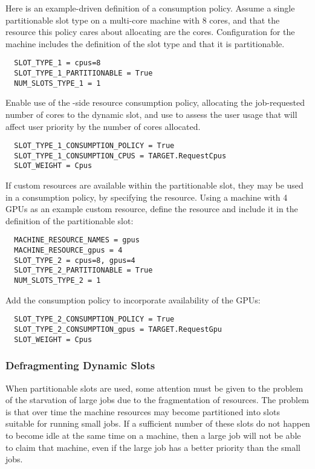 Here is an example-driven definition of a consumption policy.
Assume a single partitionable slot type on a multi-core machine with
8 cores,
and that the resource this policy cares about allocating are the cores.
Configuration for the machine includes the definition of the slot type 
and that it is partitionable.
\begin{verbatim}
  SLOT_TYPE_1 = cpus=8
  SLOT_TYPE_1_PARTITIONABLE = True
  NUM_SLOTS_TYPE_1 = 1
\end{verbatim}

Enable use of the -side resource consumption
policy, allocating the job-requested number of cores to the
dynamic slot, and use  to assess the user usage that 
will affect user priority by the number of cores allocated.
\begin{verbatim}
  SLOT_TYPE_1_CONSUMPTION_POLICY = True
  SLOT_TYPE_1_CONSUMPTION_CPUS = TARGET.RequestCpus
  SLOT_WEIGHT = Cpus
\end{verbatim}

If custom resources are available within the partitionable slot,
they may be used in a consumption policy, by specifying the 
resource.
Using a machine with 4 GPUs as an example custom resource,
define the resource and include it in the definition of the partitionable
slot:
\begin{verbatim}
  MACHINE_RESOURCE_NAMES = gpus
  MACHINE_RESOURCE_gpus = 4
  SLOT_TYPE_2 = cpus=8, gpus=4
  SLOT_TYPE_2_PARTITIONABLE = True
  NUM_SLOTS_TYPE_2 = 1
\end{verbatim}

Add the consumption policy to incorporate availability of the GPUs:
\begin{verbatim}
  SLOT_TYPE_2_CONSUMPTION_POLICY = True
  SLOT_TYPE_2_CONSUMPTION_gpus = TARGET.RequestGpu
  SLOT_WEIGHT = Cpus
\end{verbatim}


\subsubsection{\label{sec:SMP-defrag}
Defragmenting Dynamic Slots}

When partitionable slots are used, some attention must be given to the
problem of the starvation of large jobs due to the fragmentation of resources.
The problem is that over time the machine resources may become
partitioned into slots suitable for running small jobs.
If a sufficient number of these slots do not happen to become idle at the
same time on a machine, then a large job will not be able to claim that
machine, even if the large job has a better priority than the small jobs.

